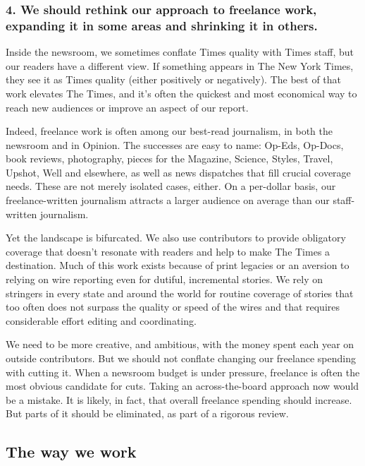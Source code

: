 \hypertarget{4-we-should-rethink-our-approach-to-freelance-work-expanding-it-in-some-areas-and-shrinking-it-in-others}{%
\subsubsection{4. We should rethink our approach to freelance work,
expanding it in some areas and shrinking it in
others.}\label{4-we-should-rethink-our-approach-to-freelance-work-expanding-it-in-some-areas-and-shrinking-it-in-others}}

Inside the newsroom, we sometimes conflate Times quality with Times
staff, but our readers have a different view. If something appears in
The New York Times, they see it as Times quality (either positively or
negatively). The best of that work elevates The Times, and it's often
the quickest and most economical way to reach new audiences or improve
an aspect of our report.

Indeed, freelance work is often among our best-read journalism, in both
the newsroom and in Opinion. The successes are easy to name: Op-Eds,
Op-Docs, book reviews, photography, pieces for the Magazine, Science,
Styles, Travel, Upshot, Well and elsewhere, as well as news dispatches
that fill crucial coverage needs. These are not merely isolated cases,
either. On a per-dollar basis, our freelance-written journalism attracts
a larger audience on average than our staff-written journalism.

Yet the landscape is bifurcated. We also use contributors to provide
obligatory coverage that doesn't resonate with readers and help to make
The Times a destination. Much of this work exists because of print
legacies or an aversion to relying on wire reporting even for dutiful,
incremental stories. We rely on stringers in every state and around the
world for routine coverage of stories that too often does not surpass
the quality or speed of the wires and that requires considerable effort
editing and coordinating.

We need to be more creative, and ambitious, with the money spent each
year on outside contributors. But we should not conflate changing our
freelance spending with cutting it. When a newsroom budget is under
pressure, freelance is often the most obvious candidate for cuts. Taking
an across-the-board approach now would be a mistake. It is likely, in
fact, that overall freelance spending should increase. But parts of it
should be eliminated, as part of a rigorous review.

\hypertarget{the-way-we-work}{%
\subsection{The way we work}\label{the-way-we-work}}

